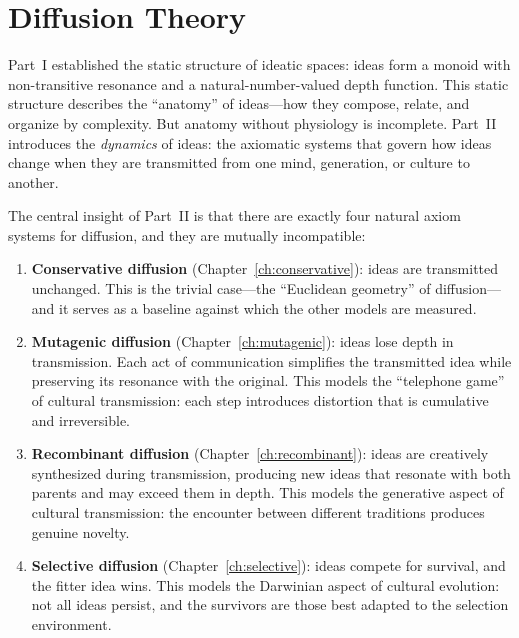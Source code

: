 \documentclass[11pt,openany]{book}
\theoremstyle{definition}
\theoremstyle{plain}
\theoremstyle{remark}
\begin{document}
\part{Diffusion Theory}

Part~I established the static structure of ideatic spaces: ideas form a monoid with non-transitive resonance and a natural-number-valued depth function. This static structure describes the ``anatomy'' of ideas---how they compose, relate, and organize by complexity. But anatomy without physiology is incomplete. Part~II introduces the \emph{dynamics} of ideas: the axiomatic systems that govern how ideas change when they are transmitted from one mind, generation, or culture to another.

The central insight of Part~II is that there are exactly four natural axiom systems for diffusion, and they are mutually incompatible:

\begin{enumerate}
\item \textbf{Conservative diffusion} (Chapter~\ref{ch:conservative}): ideas are transmitted unchanged. This is the trivial case---the ``Euclidean geometry'' of diffusion---and it serves as a baseline against which the other models are measured.

\item \textbf{Mutagenic diffusion} (Chapter~\ref{ch:mutagenic}): ideas lose depth in transmission. Each act of communication simplifies the transmitted idea while preserving its resonance with the original. This models the ``telephone game'' of cultural transmission: each step introduces distortion that is cumulative and irreversible.

\item \textbf{Recombinant diffusion} (Chapter~\ref{ch:recombinant}): ideas are creatively synthesized during transmission, producing new ideas that resonate with both parents and may exceed them in depth. This models the generative aspect of cultural transmission: the encounter between different traditions produces genuine novelty.

\item \textbf{Selective diffusion} (Chapter~\ref{ch:selective}): ideas compete for survival, and the fitter idea wins. This models the Darwinian aspect of cultural evolution: not all ideas persist, and the survivors are those best adapted to the selection environment.
\end{enumerate}
\end{document}
